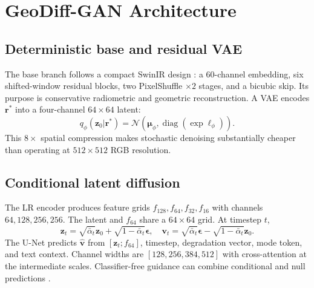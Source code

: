 \documentclass[10pt]{article}
\newcommand{\vect}[1]{\boldsymbol{#1}}
\begin{document}
\clearpage

\section{GeoDiff-GAN Architecture}
\subsection{Deterministic base and residual VAE}
The base branch follows a compact SwinIR design \citep{liang2021swinir}: a 60-channel embedding,
six shifted-window residual blocks, two PixelShuffle $\times2$ stages, and a bicubic skip. Its
purpose is conservative radiometric and geometric reconstruction. A VAE
\citep{kingma2014autoencoding} encodes $\vect{r}^{*}$ into a four-channel
$64\times64$ latent:
\begin{equation}
 q_{\phi}(\vect{z}_0|\vect{r}^{*})
 =\mathcal{N}\!\left(\vect{\mu}_{\phi},
 \operatorname{diag}(\exp \vect{\ell}_{\phi})\right).
\end{equation}
This $8\times$ spatial compression makes stochastic denoising substantially cheaper than operating
at $512\times512$ RGB resolution.

\subsection{Conditional latent diffusion}
The LR encoder produces feature grids
$f_{128},f_{64},f_{32},f_{16}$ with channels $64,128,256,256$. The latent and $f_{64}$ share a
$64\times64$ grid. At timestep $t$,
\begin{equation}
 \vect{z}_t=\sqrt{\bar{\alpha}_t}\vect{z}_0+
 \sqrt{1-\bar{\alpha}_t}\vect{\epsilon},
 \quad
 \vect{v}_t=\sqrt{\bar{\alpha}_t}\vect{\epsilon}
 -\sqrt{1-\bar{\alpha}_t}\vect{z}_0 .
\end{equation}
The U-Net predicts $\hat{\vect{v}}$ from $[\vect{z}_t;f_{64}]$, timestep, degradation vector, mode
token, and text context. Channel widths are $[128,256,384,512]$ with cross-attention at the
intermediate scales. Classifier-free guidance can combine conditional and null predictions
\citep{ho2022classifierfree}.
\end{document}
